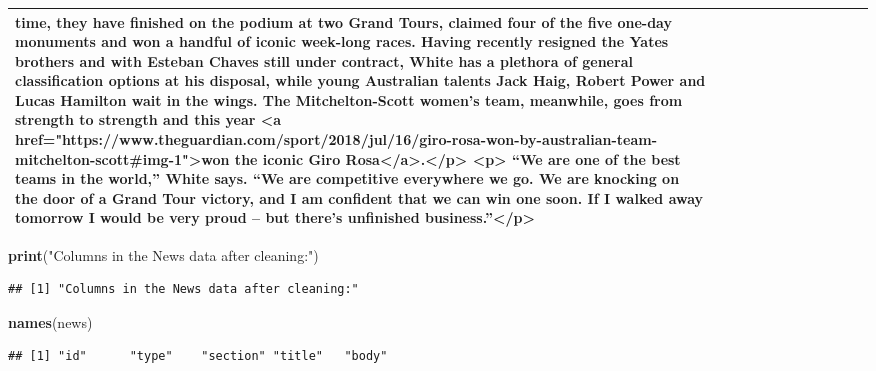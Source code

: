 \documentclass[]{article}
\newenvironment{Shaded}{\begin{snugshade}}{\end{snugshade}}
\newcommand{\KeywordTok}[1]{\textcolor[rgb]{0.13,0.29,0.53}{\textbf{#1}}}
\newcommand{\DataTypeTok}[1]{\textcolor[rgb]{0.13,0.29,0.53}{#1}}
\newcommand{\StringTok}[1]{\textcolor[rgb]{0.31,0.60,0.02}{#1}}
\newcommand{\OperatorTok}[1]{\textcolor[rgb]{0.81,0.36,0.00}{\textbf{#1}}}
\newcommand{\NormalTok}[1]{#1}
\begin{document}
\begin{table}[!h]
\begin{tabular}[t]{llllllllllll}
time, they have finished on the podium at two Grand Tours, claimed four of the five one-day monuments and won a handful of iconic week-long races. Having recently resigned the Yates brothers and with Esteban Chaves still under contract, White has a plethora of general classification options at his disposal, while young Australian talents Jack Haig, Robert Power and Lucas Hamilton wait in the wings. The Mitchelton-Scott women’s team, meanwhile, goes from strength to strength and this year <a href="https://www.theguardian.com/sport/2018/jul/16/giro-rosa-won-by-australian-team-mitchelton-scott\#img-1">won the iconic Giro Rosa</a>.</p> <p> “We are one of the best teams in the world,” White says. “We are competitive everywhere we go. We are knocking on the door of a Grand Tour victory, and I am confident that we can win one soon. If I walked away tomorrow I would be very proud – but there’s unfinished business.”</p>\\
\bottomrule
\end{tabular}
\end{table}


\begin{Shaded}
\begin{Highlighting}[]
\KeywordTok{print}\NormalTok{(}\StringTok{"Columns in the News data after cleaning:"}\NormalTok{)}
\end{Highlighting}
\end{Shaded}

\begin{verbatim}
## [1] "Columns in the News data after cleaning:"
\end{verbatim}

\begin{Shaded}
\begin{Highlighting}[]
\KeywordTok{names}\NormalTok{(news)}
\end{Highlighting}
\end{Shaded}

\begin{verbatim}
## [1] "id"      "type"    "section" "title"   "body"
\end{verbatim}

\begin{Shaded}
\end{Shaded}
\end{document}

